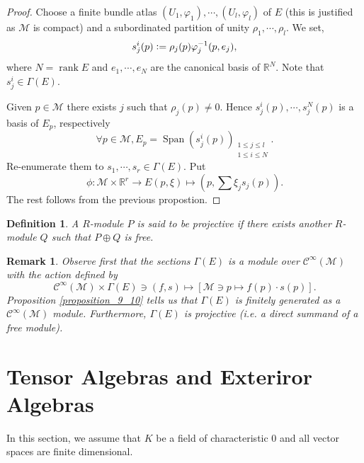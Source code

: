 \documentclass[10pt]{article}
\newtheorem{definition}{Definition}[section]
\newtheorem{remark}{Remark}[section]
\DeclareMathOperator{\rank}{rank}
\DeclareMathOperator{\Span}{Span}
\newcommand{\defeq}{\vcentcolon=}
\newcommand{\R}[0]{\mathbb{R}}
\newcommand{\M}[0]{\mathcal{M}}
\newcommand{\cinf}[0]{\mathcal{C}^\infty}
\begin{document}
\begin{proof}
  Choose a finite bundle atlas $(U_1,\varphi_1),\cdots,(U_l,\varphi_l)$ of $E$ (this is justified as $\M$ is compact) and a subordinated partition of unity $\rho_1,\cdots,\rho_l$. 
  We set, 
  \begin{equation*}
    s_j^i(p)\defeq \rho_j(p)\varphi_j^{-1}(p,e_j),
  \end{equation*}
  where $N=\rank E$ and $e_1,\cdots,e_N$ are the canonical basis of $\R^N$. Note that $s_j^i\in\Gamma(E)$. 
  \par Given $p\in\M$ there exists $j$ such that $\rho_j(p)\not=0$. Hence $s_j^i(p),\cdots,s_j^N(p)$ is a basis of $E_p$, respectively 
  \begin{equation*}
    \forall p\in \M, E_p = \Span(s_j^i(p))_{\substack{1\leq j\leq l\\ 1\leq i\leq N}}.
  \end{equation*}
  Re-enumerate them to $s_1,\cdots,s_r\in\Gamma(E)$. Put
  \begin{equation*}
    \phi:\M\times \R^r\to E (p,\xi)\mapsto(p,\sum\xi_js_j(p)).
  \end{equation*}
  The rest follows from the previous propostion.
\end{proof}

\begin{definition}
  A $R$-module $P$ is said to be projective if there exists another $R$-module $Q$ such that $P\oplus Q$ is free.
\end{definition}
\begin{remark}
  Observe first that the sections $\Gamma(E)$ is a module over $\cinf(\M)$ with the action defined by 
  \begin{equation*}
    \cinf(\M)\times \Gamma(E)\ni(f,s)\mapsto [\M\ni p\mapsto f(p)\cdot s(p)].
  \end{equation*}
  Proposition \ref{proposition_9_10} tells us that $\Gamma(E)$ is finitely generated as a $\cinf(\M)$ module. Furthermore, $\Gamma(E)$ is projective (i.e. a direct summand of a free module).
\end{remark}

\section{Tensor Algebras and Exteriror Algebras}

In this section, we assume that  $K$ be a field of characteristic $0$ and all vector spaces are finite dimensional.
\end{document}

